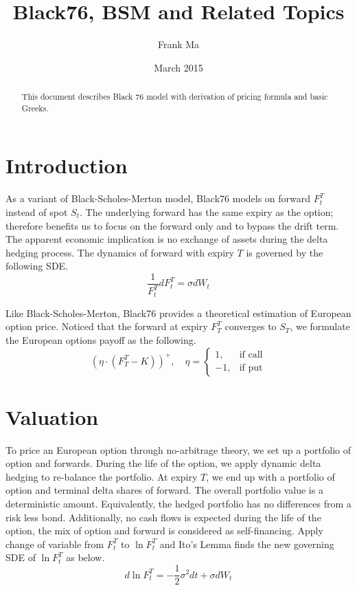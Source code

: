 \documentclass{article}
\title{Black76, BSM and Related Topics}
\author{Frank Ma}
\date{March 2015}
\begin{document}
\maketitle
 
\begin{abstract}
This document describes Black 76 model with derivation of pricing formula and basic Greeks.
\end{abstract}


\section{Introduction}

As a variant of Black-Scholes-Merton model, Black76 models on forward $ F_t^T $ instead of spot $ S_t $.
The underlying forward has the same expiry as the option; therefore benefits us to focus on the forward only and to bypass the drift term.
The apparent economic implication is no exchange of assets during the delta hedging process.
The dynamics of forward with expiry $ T $ is governed by the following SDE.
\begin{equation}\label{Black76 SDE}
    \frac{1}{F_t^T}  dF_t^T = \sigma dW_t
\end{equation}

Like Black-Scholes-Merton, Black76 provides a theoretical estimation of European option price.
Noticed that the forward at expiry $ F_T^T $ converges to $ S_T $, we formulate the European options payoff as the following.
\begin{equation}\label{Option Payoff}
    \left(\eta \cdot (F_T^T - K) \right)^+, \quad
    \eta =
    \begin{cases} 
        1, & \mbox{if call} \\
        -1, & \mbox{if put}
    \end{cases}
\end{equation}


\section{Valuation}

To price an European option through no-arbitrage theory, we set up a portfolio of option and forwards.
During the life of the option, we apply dynamic delta hedging to re-balance the portfolio.
At expiry $ T $, we end up with a portfolio of option and terminal delta shares of forward.
The overall portfolio value is a deterministic amount.
Equivalently, the hedged portfolio has no differences from a risk less bond.
Additionally, no cash flows is expected during the life of the option, the mix of option and forward is considered as self-financing.
Apply change of variable from $ F_t^T $ to $ \ln{F_t^T} $ and Ito's Lemma finds the new governing SDE of $ \ln{F_t^T} $ as below.
\begin{equation}\label{Black76 ln F SDE}
    d\ln{F_t^T} = -\frac{1}{2} \sigma^2 dt + \sigma dW_t
\end{equation}
\end{document}
